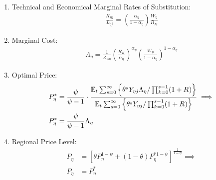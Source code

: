 \documentclass[../thesis.tex]{subfiles}
\begin{document}
\begin{enumerate}
	\item Technical and Economical Marginal Rates of Substitution:
	\begin{align}
		\frac{K_{\eta j}}{L_{\eta j}} = \left( \frac{{\alpha_{\eta}}}{1-\alpha_{\eta}} \right) \frac{W_{\eta}}{R_{K}} \label{eq_v2:reg-ss-int-good-firm-TMRS}
	\end{align}
	
	\begin{comment}
		
			\item Production Function:
		\begin{align}
			Y_{\eta j} = Z_{A\eta} L_{\eta j} \label{eq_v2:reg-ss-int-good-firm-production-function}
		\end{align}
		
		\item Marginal Cost:
		\begin{align}
			\Lambda_{\eta} = \frac{W_{\eta}}{Z_{A\eta}} \label{eq_v2:reg-ss-int-good-firm-FOC-Lt}
		\end{align}		
		
	\end{comment}
	
	\item Marginal Cost:
	\begin{align}
		\Lambda_{\eta} = \frac{1}{Z_{A\eta}} \left( \frac{R_{K}}{{\alpha_{\eta}}} \right)^{{\alpha_{\eta}}} \left( \frac{W_{\eta}}{1-\alpha_{\eta}} \right)^{1-\alpha_{\eta}} \label{eq_v2:reg-ss-int-good-firm-MC-2}
	\end{align}
	
	\item Optimal Price:
	\begin{align}
		P_{\eta}^{\ast} &= \frac{\psi}{\psi-1} \cdot \frac{ {\mathbb{E}_{t}} \sum_{s=0}^{\infty} \left\{ \theta^s Y_{\eta j} \Lambda_{\eta} / \prod_{k=0}^{s-1}(1+R_{}) \right\}} {{\mathbb{E}_{t}} \sum_{s=0}^{\infty} \left\{ \theta^s Y_{\eta j} / \prod_{k=0}^{s-1}(1 + R_{}) \right\}} \implies \nonumber \\
		P_{\eta}^{\ast} &= \frac{\psi}{\psi-1} \Lambda_{\eta} \label{eq_v2:reg-ss-int-good-firm-optimal-price-FOC-3}
	\end{align}
	
	\item Regional Price Level:
	\begin{align}
		P_{\eta} &= \left[ \theta P_{\eta}^{1-\psi} + (1-\theta) P_{\eta}^{\ast 1-\psi} \right]^\frac{1}{1-\psi} \implies \nonumber \\
		P_{\eta} &= P_{\eta}^{\ast} \label{eq_v2:reg-ss-general-price-level}
	\end{align}
	

\end{enumerate}
\end{document}
